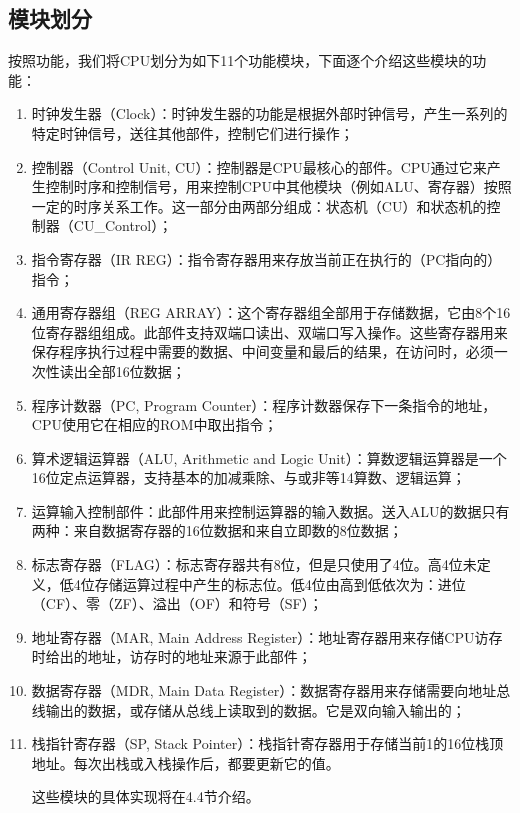 \documentclass[titlepage, 11pt]{article}
\begin{document}
	\subsection{模块划分}
	按照功能，我们将CPU划分为如下11个功能模块，下面逐个介绍这些模块的功能：
	\begin{enumerate}%
		\item 时钟发生器（Clock）：时钟发生器的功能是根据外部时钟信号，产生一系列的特定时钟信号，送往其他部件，控制它们进行操作；
		\item 控制器（Control Unit, CU）：控制器是CPU最核心的部件。CPU通过它来产生控制时序和控制信号，用来控制CPU中其他模块（例如ALU、寄存器）按照一定的时序关系工作。这一部分由两部分组成：状态机（CU）和状态机的控制器（CU\_Control）；
		\item 指令寄存器（IR REG）：指令寄存器用来存放当前正在执行的（PC指向的）指令；
		\item 通用寄存器组（REG ARRAY）：这个寄存器组全部用于存储数据，它由8个16位寄存器组组成。此部件支持双端口读出、双端口写入操作。这些寄存器用来保存程序执行过程中需要的数据、中间变量和最后的结果，在访问时，必须一次性读出全部16位数据；
		\item 程序计数器（PC, Program Counter）：程序计数器保存下一条指令的地址，CPU使用它在相应的ROM中取出指令；
		\item 算术逻辑运算器（ALU, Arithmetic and Logic Unit）：算数逻辑运算器是一个16位定点运算器，支持基本的加减乘除、与或非等14算数、逻辑运算；
		\item 运算输入控制部件：此部件用来控制运算器的输入数据。送入ALU的数据只有两种：来自数据寄存器的16位数据和来自立即数的8位数据；
		\item 标志寄存器（FLAG）：标志寄存器共有8位，但是只使用了4位。高4位未定义，低4位存储运算过程中产生的标志位。低4位由高到低依次为：进位（CF）、零（ZF）、溢出（OF）和符号（SF）；
		\item 地址寄存器（MAR, Main Address Register）：地址寄存器用来存储CPU访存时给出的地址，访存时的地址来源于此部件；
		\item 数据寄存器（MDR, Main Data Register）：数据寄存器用来存储需要向地址总线输出的数据，或存储从总线上读取到的数据。它是双向输入输出的；
		\item 栈指针寄存器（SP, Stack Pointer）：栈指针寄存器用于存储当前1的16位栈顶地址。每次出栈或入栈操作后，都要更新它的值。\par 
		这些模块的具体实现将在4.4节介绍。
	\end{enumerate}
\end{document}
